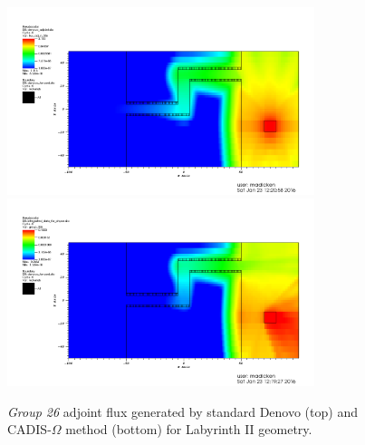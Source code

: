 \documentclass[12pt]{article}
\begin{document}
\begin{figure}
  \begin{center}
    \includegraphics[width=0.80\textwidth]{./images/maze2_adjoint_group26_adjusted.png}
    \includegraphics[width=0.80\textwidth]{./images/maze2_myflux_group26_adjusted.png}
    \caption[]{\label{fig::adjoint_fluxes_group26}\textit{Group 26} adjoint flux generated by standard Denovo (top) and CADIS-$\Omega$ method (bottom) for Labyrinth II geometry.}
  \end{center}
\end{figure}
\end{document}
